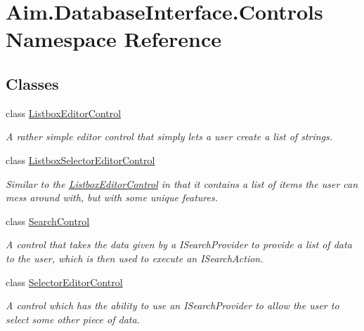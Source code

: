 \hypertarget{namespace_aim_1_1_database_interface_1_1_controls}{}\section{Aim.\+Database\+Interface.\+Controls Namespace Reference}
\label{namespace_aim_1_1_database_interface_1_1_controls}
\subsection*{Classes}
\begin{DoxyCompactItemize}
\item 
class \mbox{\hyperlink{class_aim_1_1_database_interface_1_1_controls_1_1_listbox_editor_control}{Listbox\+Editor\+Control}}
\begin{DoxyCompactList}\small\item\em A rather simple editor control that simply lets a user create a list of strings. \end{DoxyCompactList}\item 
class \mbox{\hyperlink{class_aim_1_1_database_interface_1_1_controls_1_1_listbox_selector_editor_control}{Listbox\+Selector\+Editor\+Control}}
\begin{DoxyCompactList}\small\item\em Similar to the \mbox{\hyperlink{class_aim_1_1_database_interface_1_1_controls_1_1_listbox_editor_control}{Listbox\+Editor\+Control}} in that it contains a list of items the user can mess around with, but with some unique features. \end{DoxyCompactList}\item 
class \mbox{\hyperlink{class_aim_1_1_database_interface_1_1_controls_1_1_search_control}{Search\+Control}}
\begin{DoxyCompactList}\small\item\em A control that takes the data given by a I\+Search\+Provider to provide a list of data to the user, which is then used to execute an I\+Search\+Action. \end{DoxyCompactList}\item 
class \mbox{\hyperlink{class_aim_1_1_database_interface_1_1_controls_1_1_selector_editor_control}{Selector\+Editor\+Control}}
\begin{DoxyCompactList}\small\item\em A control which has the ability to use an I\+Search\+Provider to allow the user to select some other piece of data. \end{DoxyCompactList}\end{DoxyCompactItemize}
